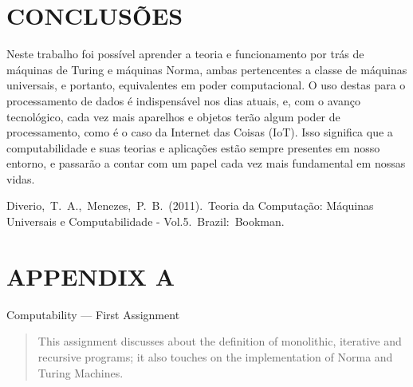 \documentclass[12pt,fleqn]{article}
\begin{document}
\newpage
\section{CONCLUSÕES}
Neste trabalho foi possível aprender a teoria e funcionamento por trás de
máquinas de Turing e máquinas Norma, ambas pertencentes a classe de máquinas
universais, e portanto, equivalentes em poder computacional. O uso destas para o
processamento de dados é indispensável nos dias atuais, e, com o avanço
tecnológico, cada vez mais aparelhos e objetos terão algum poder de
processamento, como é o caso da Internet das Coisas (IoT). Isso significa que a
computabilidade e suas teorias e aplicações estão sempre presentes em nosso
entorno, e passarão a contar com um papel cada vez mais fundamental em nossas
vidas.

\begin{thebibliography}{99}
\fontsize{11}{0}\selectfont
{}
Diverio, T. A., Menezes, P. B. (2011). Teoria da Computação: Máquinas Universais
e Computabilidade - Vol.5. Brazil: Bookman.
\end{thebibliography}
\vspace*{-0.1cm}
\section*{APPENDIX A}


\begin{center}
  Computability --- First Assignment
\end{center}

\def\abstractname{Abstract}%

\begin{abstract}
   This assignment discusses about the definition of monolithic, iterative and
   recursive programs; it also touches on the implementation of Norma and
   Turing Machines.
\end{abstract}

\end{document}
